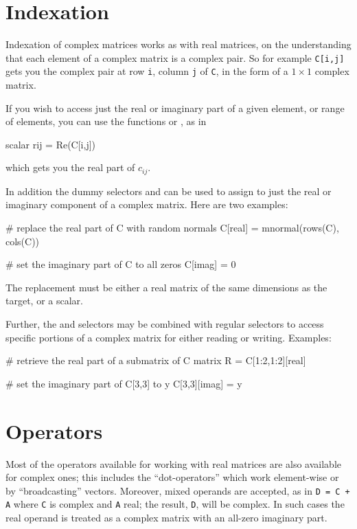 \section{Indexation}

Indexation of complex matrices works as with real matrices, on the
understanding that each element of a complex matrix is a complex
pair. So for example \texttt{C[i,j]} gets you the complex pair at row
\texttt{i}, column \texttt{j} of \texttt{C}, in the form of a
$1 \times 1$ complex matrix.

If you wish to access just the real or imaginary part of a given
element, or range of elements, you can use the functions 
or , as in
\begin{code}
scalar rij = Re(C[i,j])
\end{code}
which gets you the real part of $c_{ij}$.

In addition the dummy selectors  and  can be
used to assign to just the real or imaginary component of a complex
matrix. Here are two examples:
\begin{code}
# replace the real part of C with random normals
C[real] = mnormal(rows(C), cols(C))

# set the imaginary part of C to all zeros
C[imag] = 0
\end{code}
The replacement must be either a real matrix of the same dimensions as
the target, or a scalar.

Further, the  and  selectors may be combined
with regular selectors to access specific portions of a complex matrix
for either reading or writing. Examples:
\begin{code}
# retrieve the real part of a submatrix of C
matrix R = C[1:2,1:2][real]

# set the imaginary part of C[3,3] to y
C[3,3][imag] = y
\end{code}

\section{Operators}
\label{sec:cmplx-ops}

Most of the operators available for working with real matrices are
also available for complex ones; this includes the ``dot-operators''
which work element-wise or by ``broadcasting'' vectors. Moreover,
mixed operands are accepted, as in \texttt{D = C + A} where \texttt{C}
is complex and \texttt{A} real; the result, \texttt{D}, will be
complex. In such cases the real operand is treated as a complex matrix
with an all-zero imaginary part.

